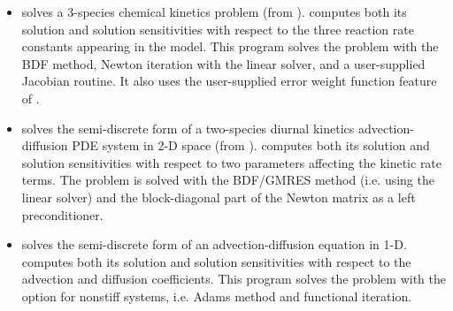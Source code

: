 \begin{itemize}
\item {}
  solves a 3-species chemical kinetics problem (from ).
  \newline
  {\cvodes} computes both its solution and solution sensitivities with respect
  to the three reaction rate constants appearing in the model. 
  This program solves the problem with the BDF method, Newton          
  iteration with the {\cvdense} linear solver, and a user-supplied    
  Jacobian routine. It also uses the user-supplied error
  weight function feature of {\cvodes}.
\item {}
  solves the semi-discrete form of a two-species diurnal kinetics
  advection-diffusion PDE system in 2-D space (from ).
  \newline
  {\cvodes} computes both its solution and solution sensitivities with respect
  to two parameters affecting the kinetic rate terms.
  The problem is solved with the BDF/GMRES method (i.e. using the {\cvspgmr}
  linear solver) and the block-diagonal part of the  
  Newton matrix as a left preconditioner.
\item {}
  solves the semi-discrete form of an advection-diffusion equation in 1-D.
  \newline
  {\cvodes} computes both its solution and solution sensitivities with respect
  to the advection and diffusion coefficients.
  This program solves the problem with the option for nonstiff systems,
  i.e. Adams method and functional iteration.



\end{itemize}
